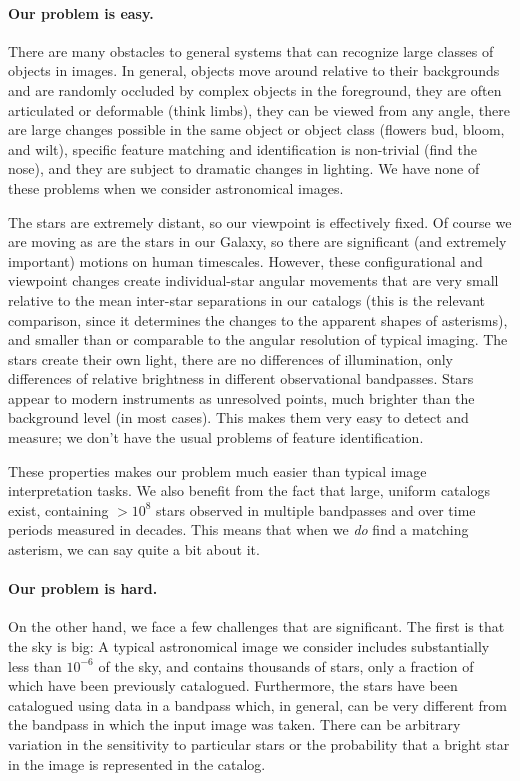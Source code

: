 \documentclass[12pt,preprint]{aastex}
\renewcommand{\%}{\percent}
\begin{document}
\paragraph{Our problem is easy.}
There are many obstacles to general systems that can
recognize large classes of objects in images.  In general, objects
move around relative to their backgrounds and are randomly occluded by
complex objects in the foreground, they are often articulated or
deformable (think limbs), they can be viewed from any angle, there are
large changes possible in the same object or object class (flowers
bud, bloom, and wilt), specific feature matching and identification is
non-trivial (find the nose), and they are subject to dramatic changes
in lighting.  We have none of these problems when we consider
astronomical images.

The stars are extremely distant, so our viewpoint is effectively
fixed.  Of course we are moving as are the stars in our Galaxy, so
there are significant (and extremely important) motions on human
timescales.  However, these configurational and viewpoint changes
create individual-star angular movements that are very small relative
to the mean inter-star separations in our catalogs (this is the
relevant comparison, since it determines the changes to the apparent
shapes of asterisms), and smaller than or comparable to the angular
resolution of typical imaging.  The stars create their own light,
there are no differences of illumination, only differences of relative
brightness in different observational bandpasses.  Stars appear
to modern instruments as unresolved points, much brighter than the
background level (in most cases).  This makes them very easy to detect
and measure; we don't have the usual problems of feature
identification.

These properties makes our problem much easier than typical image
interpretation tasks.  We also benefit from the fact that large,
uniform catalogs exist, containing $>10^8$ stars observed in multiple
bandpasses and over time periods measured in decades.  This means that
when we \emph{do} find a matching asterism, we can say quite a bit
about it.

\paragraph{Our problem is hard.}
On the other hand, we face a few challenges that are significant.  The
first is that the sky is big: A typical astronomical image we consider
includes substantially less than $10^{-6}$ of the sky, and contains
thousands of stars, only a fraction of which have been previously
catalogued.  Furthermore, the stars have been catalogued using data in
a bandpass which, in general, can be very different from the bandpass
in which the input image was taken.  There can be arbitrary variation
in the sensitivity to particular stars or the probability that a
bright star in the image is represented in the catalog.
\end{document}
